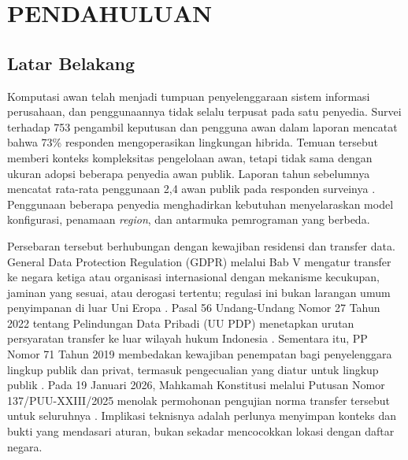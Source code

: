 \cleardoublepage

\chapter{PENDAHULUAN}

\label{chap:pendahuluan}


\section{Latar Belakang}

Komputasi awan telah menjadi tumpuan penyelenggaraan sistem informasi perusahaan, dan penggunaannya tidak selalu terpusat pada satu penyedia. Survei terhadap 753 pengambil keputusan dan pengguna awan dalam laporan \textcite{flexera2026} mencatat bahwa 73\% responden mengoperasikan lingkungan hibrida. Temuan tersebut memberi konteks kompleksitas pengelolaan awan, tetapi tidak sama dengan ukuran adopsi beberapa penyedia awan publik. Laporan tahun sebelumnya mencatat rata-rata penggunaan 2,4 awan publik pada responden surveinya \autocite{flexera2025}. Penggunaan beberapa penyedia menghadirkan kebutuhan menyelaraskan model konfigurasi, penamaan \textit{region}, dan antarmuka pemrograman yang berbeda.

Persebaran tersebut berhubungan dengan kewajiban residensi dan transfer data. General Data Protection Regulation (GDPR\label{abbr:gdpr}) melalui Bab V mengatur transfer ke negara ketiga atau organisasi internasional dengan mekanisme kecukupan, jaminan yang sesuai, atau derogasi tertentu; regulasi ini bukan larangan umum penyimpanan di luar Uni Eropa \autocite{edpb2023}. Pasal 56 Undang-Undang Nomor 27 Tahun 2022 tentang Pelindungan Data Pribadi (UU PDP\label{abbr:uupdp}) menetapkan urutan persyaratan transfer ke luar wilayah hukum Indonesia \autocite[Pasal 56]{uupdp2022}. Sementara itu, PP Nomor 71 Tahun 2019 membedakan kewajiban penempatan bagi penyelenggara lingkup publik dan privat, termasuk pengecualian yang diatur untuk lingkup publik \autocite[Pasal 20--21]{pp712019}. Pada 19 Januari 2026, Mahkamah Konstitusi melalui Putusan Nomor 137/PUU-XXIII/2025 menolak permohonan pengujian norma transfer tersebut untuk seluruhnya \autocite[hlm. 220--222]{mk2026}. Implikasi teknisnya adalah perlunya menyimpan konteks dan bukti yang mendasari aturan, bukan sekadar mencocokkan lokasi dengan daftar negara.

